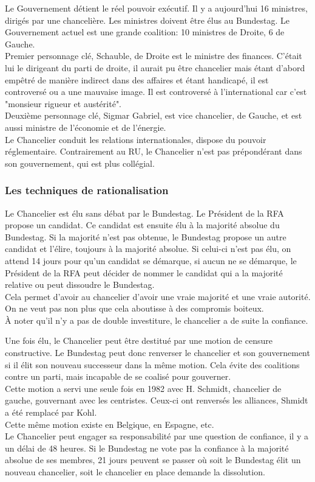 \documentclass[10pt, a4paper, openany]{book}
\begin{document}
Le Gouvernement détient le réel pouvoir exécutif. Il y a aujourd'hui 16 ministres, dirigés par une chancelière. Les ministres doivent être élus au Bundestag. Le Gouvernement actuel est une grande coalition: 10 ministres de Droite, 6 de Gauche. \\
Premier personnage clé, Schauble, de Droite est le ministre des finances. C'était lui le dirigeant du parti de droite, il aurait pu être chancelier mais étant d'abord empêtré de manière indirect dans des affaires et étant handicapé, il est controversé ou a une mauvaise image. Il est controversé à l'international car c'est "monsieur rigueur et austérité". \\
Deuxième personnage clé, Sigmar Gabriel, est vice chancelier, de Gauche, et est aussi ministre de l'économie et de l'énergie. \\
Le Chancelier conduit les relations internationales, dispose du pouvoir réglementaire. Contrairement au RU, le Chancelier n'est pas prépondérant dans son gouvernement, qui est plus collégial. 

\subsubsection{Les techniques de rationalisation}

Le Chancelier est élu sans débat par le Bundestag. Le Président de la RFA propose un candidat. Ce candidat est ensuite élu à la majorité absolue du Bundestag. Si la majorité n'est pas obtenue, le Bundestag propose un autre candidat et l'élire, toujours à la majorité absolue. Si celui-ci n'est pas élu, on attend 14 jours pour qu'un candidat se démarque, si aucun ne se démarque, le Président de la RFA peut décider de nommer le candidat qui a la majorité relative ou peut dissoudre le Bundestag. \\
Cela permet d'avoir au chancelier d'avoir une vraie majorité et une vraie autorité. On ne veut pas non plus que cela aboutisse à des compromis boiteux. \\
À noter qu'il n'y a pas de double investiture, le chancelier a de suite la confiance. 


Une fois élu, le Chancelier peut être destitué par une motion de censure constructive. Le Bundestag peut donc renverser le chancelier et son gouvernement si il élit son nouveau successeur dans la même motion. Cela évite des coalitions contre un parti, mais incapable de se coalisé pour gouverner. \\
Cette motion a servi une seule fois en 1982 avec H. Schmidt, chancelier de gauche, gouvernant avec les centristes. Ceux-ci ont renversés les alliances, Shmidt a été remplacé par Kohl. \\
Cette même motion existe en Belgique, en Espagne, etc. \\
Le Chancelier peut engager sa responsabilité par une question de confiance, il y a un délai de 48 heures. Si le Bundestag ne vote pas la confiance à la majorité absolue de ses membres, 21 jours peuvent se passer où soit le Bundestag élit un nouveau chancelier, soit le chancelier en place demande la dissolution. 
\end{document}
